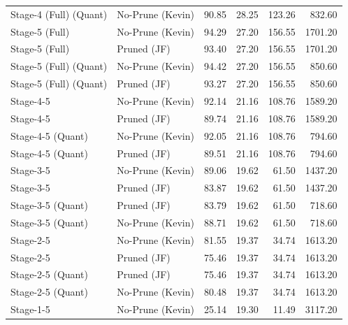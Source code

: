 \begin{table}
\begin{tabular}{llrrrr}
Stage-4 (Full)
(Quant) & No-Prune (Kevin) & 90.85 & 28.25 & 123.26 & 832.60 \\
Stage-5 (Full) & No-Prune (Kevin) & 94.29 & 27.20 & 156.55 & 1701.20 \\
Stage-5 (Full) & Pruned (JF) & 93.40 & 27.20 & 156.55 & 1701.20 \\
Stage-5 (Full)
(Quant) & No-Prune (Kevin) & 94.42 & 27.20 & 156.55 & 850.60 \\
Stage-5 (Full)
(Quant) & Pruned (JF) & 93.27 & 27.20 & 156.55 & 850.60 \\
Stage-4-5 & No-Prune (Kevin) & 92.14 & 21.16 & 108.76 & 1589.20 \\
Stage-4-5 & Pruned (JF) & 89.74 & 21.16 & 108.76 & 1589.20 \\
Stage-4-5
(Quant) & No-Prune (Kevin) & 92.05 & 21.16 & 108.76 & 794.60 \\
Stage-4-5
(Quant) & Pruned (JF) & 89.51 & 21.16 & 108.76 & 794.60 \\
Stage-3-5 & No-Prune (Kevin) & 89.06 & 19.62 & 61.50 & 1437.20 \\
Stage-3-5 & Pruned (JF) & 83.87 & 19.62 & 61.50 & 1437.20 \\
Stage-3-5
(Quant) & Pruned (JF) & 83.79 & 19.62 & 61.50 & 718.60 \\
Stage-3-5
(Quant) & No-Prune (Kevin) & 88.71 & 19.62 & 61.50 & 718.60 \\
Stage-2-5 & No-Prune (Kevin) & 81.55 & 19.37 & 34.74 & 1613.20 \\
Stage-2-5 & Pruned (JF) & 75.46 & 19.37 & 34.74 & 1613.20 \\
Stage-2-5
(Quant) & Pruned (JF) & 75.46 & 19.37 & 34.74 & 1613.20 \\
Stage-2-5
(Quant) & No-Prune (Kevin) & 80.48 & 19.37 & 34.74 & 1613.20 \\
Stage-1-5 & No-Prune (Kevin) & 25.14 & 19.30 & 11.49 & 3117.20 \\
\bottomrule
\end{tabular}
\end{table}
